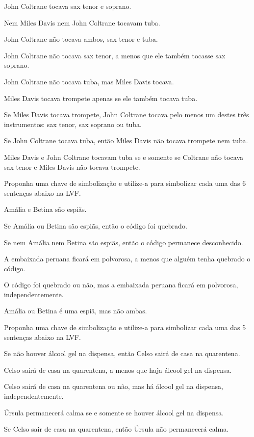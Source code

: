 \begin{earg}
	\item John Coltrane tocava sax tenor e soprano.
	\item Nem Miles Davis nem John Coltrane tocavam tuba.
	\item John Coltrane não tocava ambos, sax tenor e tuba.
	\item John Coltrane não tocava sax tenor, a menos que ele também tocasse sax soprano.
	\item John Coltrane não tocava tuba, mas Miles Davis tocava.
	\item Miles Davis tocava trompete apenas se ele também tocava tuba.
	\item Se Miles Davis tocava trompete, John Coltrane tocava pelo menos um destes três instrumentos: sax tenor, sax soprano ou tuba.
	\item Se John Coltrane tocava tuba, então  Miles Davis não tocava trompete nem tuba.
	\item Miles Davis e John Coltrane tocavam tuba se e somente se Coltrane não tocava sax tenor e Miles Davis não tocava trompete.
\end{earg}

\solutions
\problempart
\label{pr.spies}
Proponha uma chave de simbolização e utilize-a para simbolizar  cada uma das 6 sentenças abaixo na LVF.
\begin{earg}
	\item Amália e Betina são espiãs.
	\item Se Amália ou Betina são espiãs, então o código foi quebrado.
	\item Se nem Amália nem Betina são espiãs, então o código permanece desconhecido.
	\item A embaixada peruana ficará em polvorosa, a menos que alguém tenha quebrado o código.
	\item O código foi quebrado ou não, mas a embaixada peruana ficará em polvorosa, independentemente.
	\item Amália ou Betina é uma espiã, mas não ambas.
\end{earg}

\solutions
\problempart Proponha uma chave de simbolização e utilize-a para simbolizar  cada uma das 5 sentenças abaixo na LVF.
\begin{earg}
	\item Se não houver álcool gel na dispensa, então Celso sairá de casa na quarentena.
	\item Celso sairá de casa na quarentena, a menos que haja álcool gel na dispensa.
	\item Celso sairá de casa na quarentena ou não, mas há álcool gel na dispensa, independentemente.
	\item Úrsula permanecerá calma se e somente se houver álcool gel na dispensa.
	\item Se Celso sair de casa na quarentena, então Úrsula não permanecerá calma.
\end{earg}


